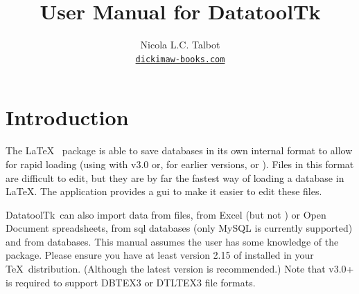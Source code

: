 
\usepackage{fontspec}
\setmainfont{Linux Libertine O}
\usepackage{verbatim}
\usepackage
 [
    novref,
 ]{texjavahelp}

\hypersetup{colorlinks,linkcolor=blue}

\graphicspath{{images/}}


\newcommand{\actionoptval}[2]{\actionopt{#1}\dequals #2}
\newcommand{\actionoptvalm}[2]{\actionopt{#1}\dequals \marg{#2}}

\newcommand{\appname}{DatatoolTk}

\title{User Manual for \appname}
\author{Nicola L.C. Talbot\\\href{https://www.dickimaw-books.com/}{\nolinkurl{dickimaw-books.com}}}


\GlsXtrLoadResources[src={datatooltk,\langbibsrcs},
 \TeXJavaHelpSymbolResourceOptions
]

\GlsXtrLoadResources[src={datatooltk,\langbibsrcs},
 \TeXJavaHelpGlsResourceOptions
]


\maketitle
\frontmatter
\tableofcontents
\listoffigures

\mainmatter
\chapter{Introduction}
\label{sec:introduction}

The \LaTeX\  package is able to save databases in its
own internal format to allow for rapid loading (using
 with
 v3.0 or, for earlier versions,
 or
).  Files in this
 format are difficult to edit, but they are by far the
fastest way of loading a  \gls{database} in \LaTeX.
The  application provides a \gls{gui} to make it
easier to edit these files. 

\appname\ can also import data from  files, from Excel
 (but not ) or Open Document 
spreadsheets, from \gls{sql} databases (only MySQL is currently
supported) and from  databases.  This manual assumes
the user has some knowledge of the  package. Please
ensure you have at least version 2.15 of  installed in
your \TeX\ distribution.  (Although the latest version is
recommended.) Note that  v3.0+ is required to support 
\gls{DBTEX3} or \gls{DTLTEX3} file formats.

